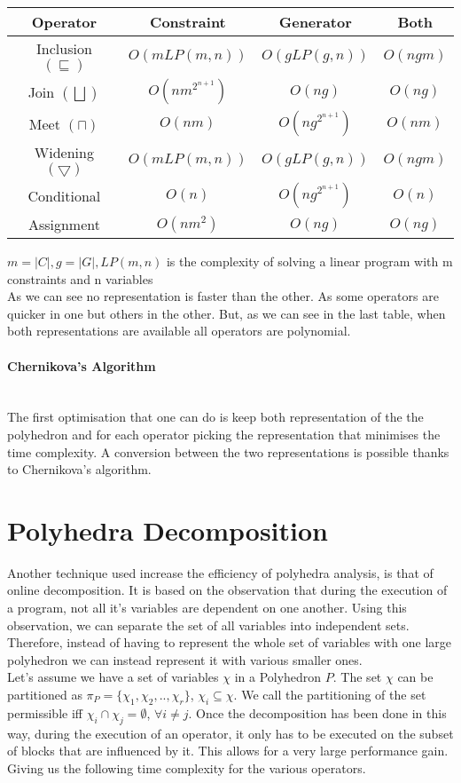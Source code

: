 \begin{center}
\begin{tabular}{||c c c c||} 
 
 \hline
 Operator & Constraint & Generator & Both \\ [0.5ex] 
 \hline
 Inclusion $(\sqsubseteq)$ & $O(mLP(m,n))$ & $O(gLP(g,n))$ & $O(ngm)$ \\ 
 \hline
 Join $(\bigsqcup)$ & $O(nm^{2^{n+1}})$ & $O(ng)$ & $O(ng)$ \\
 \hline
 Meet $(\sqcap)$ & $O(nm)$ & $O(ng^{2^{n+1}})$ & $O(nm)$\\
 \hline
 Widening $(\bigtriangledown)$ & $O(mLP(m,n))$ & $O(gLP(g,n))$ & $O(ngm)$ \\
 \hline
 Conditional & $O(n)$ & $O(ng^{2^{n+1}})$ & $O(n)$ \\ 
 \hline
 Assignment & $O(nm^2)$ & $O(ng)$ & $O(ng)$ \\ 
 
 
 \hline
\end{tabular}
\end{center}
$m=|C|,g=|G|,LP(m,n)$ is the complexity of solving a linear program with m constraints and n variables\\
As we can see no representation is faster than the other. As some operators are quicker in one but others in the other. But, as we can see in the last table, when both representations are available all operators are polynomial.\\
\paragraph{Chernikova's Algorithm} \mbox{}\\
 The first optimisation that one can do is keep both representation of the the polyhedron and for each operator picking the representation that minimises the time complexity. A conversion between the two representations is possible thanks to Chernikova's algorithm. 
 
 \section{Polyhedra Decomposition}
Another technique used increase the efficiency of polyhedra analysis, is that of online decomposition. It is based on the observation that during the execution of a program, not all it's variables are dependent on one another. Using this observation, we can separate the set of all variables into independent sets. Therefore, instead of having to represent the whole set of variables with one large polyhedron we can instead represent it with various smaller ones.\\ Let's assume we have a set of variables $\chi$ in a Polyhedron $P$. The set $\chi$ can be partitioned as $\pi_P=\{ \chi_1,\chi_2,..,\chi_r\}$, $\chi_i\subseteq\chi $. We call the partitioning of the set permissible iff $ \chi_i \cap \chi_j = \emptyset$, $ \forall i \neq j$. Once the decomposition has been done in this way, during the execution of an operator, it only has to be executed on the subset of blocks that are influenced by it. This allows for a very large performance gain. Giving us the following time complexity for the various operators.

